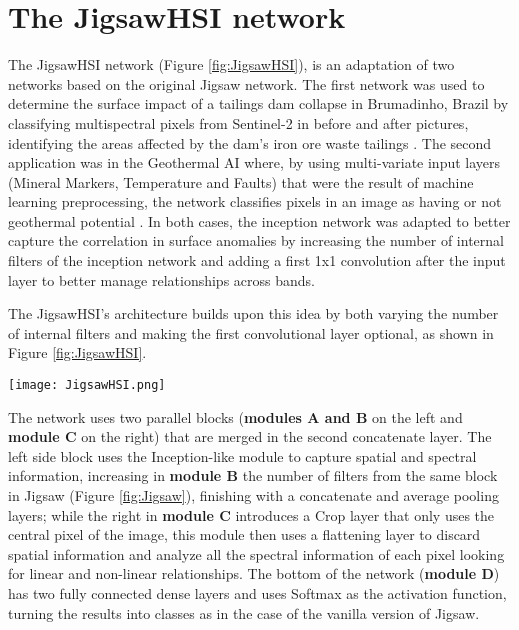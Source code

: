 \documentclass[lettersize, journal]{IEEEtran}
\begin{document}
\section{The JigsawHSI network}
The JigsawHSI network (Figure \ref{fig:JigsawHSI}), is an adaptation of two networks based on the original Jigsaw network. 
The first network was used to determine the surface impact of a tailings dam collapse in Brumadinho, Brazil by classifying multispectral pixels from Sentinel-2 in before and after pictures, identifying the areas affected by the dam's iron ore waste tailings \cite{moraga_monitoring_2020}. The second application was in the Geothermal AI where, by using multi-variate input layers (Mineral Markers, Temperature and Faults) that were the result of machine learning preprocessing, the network classifies pixels in an image as having or not geothermal potential \cite{moraga_geothermal_2022}.  In both cases, the inception network \cite{szegedy_inception-v4_2017} was adapted to better capture the correlation in surface anomalies by increasing the number of internal filters of the inception network and adding a first 1x1 convolution after the input layer to better manage relationships across bands.

The JigsawHSI's architecture builds upon this idea by both varying the number of internal  filters and making the first  convolutional layer optional, as shown in Figure \ref{fig:JigsawHSI}.

\begin{figure*}[!htb]
    \centering
    \texttt{[image: JigsawHSI.png]}
    \caption{JigsawHSI architecture. The dotted lined layers are optional}
    \label{fig:JigsawHSI}
\end{figure*}

The network uses two parallel blocks (\textbf{modules A and B} on the left and \textbf{module C} on the right) that are merged in the second concatenate layer. The left side block uses the Inception-like module to capture spatial and spectral information, increasing in \textbf{module B} the number of  filters from the same block in Jigsaw (Figure \ref{fig:Jigsaw}), finishing with a concatenate and average pooling layers; while the right in \textbf{module C} introduces a Crop layer that only uses the central pixel of the image, this module then uses a flattening layer to discard spatial information and analyze all the spectral information of each pixel looking for linear and non-linear relationships. The bottom of the  network (\textbf{module D}) has two fully connected dense layers and uses Softmax as the activation function, turning the results into classes as in the case of the vanilla version of Jigsaw.
\end{document}
